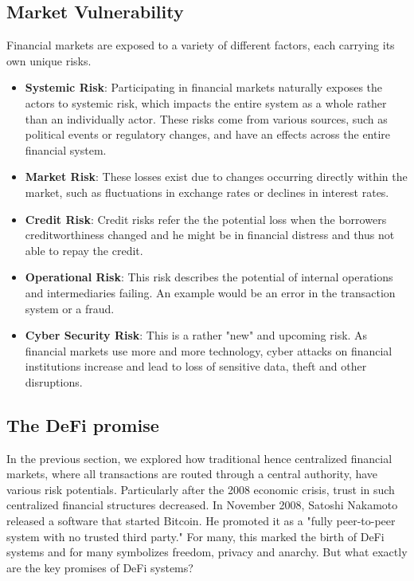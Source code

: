 \documentclass{article}
\begin{document}
\subsection{Market Vulnerability} 
Financial markets are exposed to a variety of different factors, each carrying its own unique risks.
\begin{itemize}
    \item \textbf{Systemic Risk}: Participating in financial markets naturally exposes the actors to systemic risk, which impacts the entire system as a whole rather than an individually actor. These risks come from various sources, such as political events or regulatory changes, and have an effects across the entire financial system.
    \item \textbf{Market Risk}:  These losses exist due to changes occurring directly within the market, such as fluctuations in exchange rates or declines in interest rates.
     \item \textbf{Credit Risk}:  Credit risks refer the the potential loss when the borrowers creditworthiness changed and he might be in financial distress and thus not able to repay the credit.
    \item \textbf{Operational Risk}:  This risk describes the potential of internal operations and intermediaries failing. An example would be an error in the transaction system or a fraud.
    \item \textbf{Cyber Security Risk}: This is a rather "new" and upcoming risk. As financial markets use more and more technology, cyber attacks on financial institutions increase and lead to loss of sensitive data, theft and other disruptions. 
\end{itemize}


\subsection{The DeFi promise } 
In the previous section, we explored how traditional hence centralized financial markets, where all transactions are routed through a central authority, have various risk potentials. Particularly after the 2008 economic crisis, trust in such centralized financial structures decreased. In November 2008, Satoshi Nakamoto released a software that started Bitcoin. He promoted it as a "fully peer-to-peer system with no trusted third party." For many, this marked the birth of DeFi systems and for many symbolizes freedom, privacy and anarchy. But what exactly are the key promises of DeFi systems?
\end{document}
